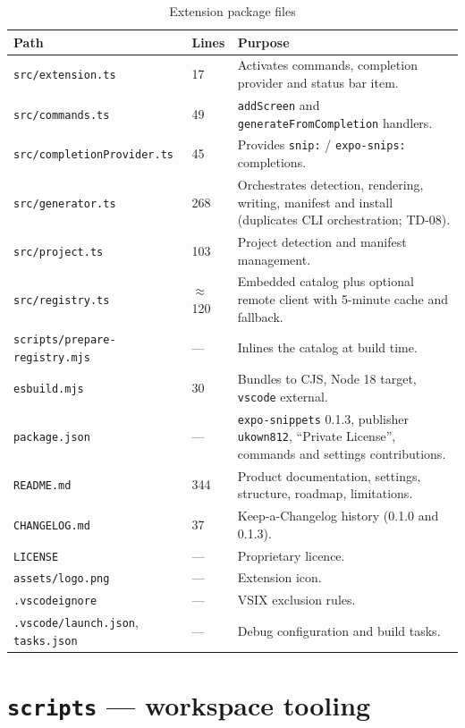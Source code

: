 \begin{longtable}{p{6cm}p{2.2cm}p{6.2cm}}
\caption{Extension package files}\\
\toprule
\textbf{Path} & \textbf{Lines} & \textbf{Purpose} \\
\midrule

\texttt{src/extension.ts} & 17 & Activates commands, completion provider and status
bar item. \\
\texttt{src/commands.ts} & 49 & \texttt{addScreen} and
\texttt{generateFromCompletion} handlers. \\
\texttt{src/completionProvider.ts} & 45 & Provides \texttt{snip:} /
\texttt{expo-snips:} completions. \\
\texttt{src/generator.ts} & 268 & Orchestrates detection, rendering, writing,
manifest and install (duplicates CLI orchestration; TD-08). \\
\texttt{src/project.ts} & 103 & Project detection and manifest management. \\
\texttt{src/registry.ts} & $\approx$120 & Embedded catalog plus optional remote
client with 5-minute cache and fallback. \\
\texttt{scripts/prepare-registry.mjs} & --- & Inlines the catalog at build time. \\
\texttt{esbuild.mjs} & 30 & Bundles to CJS, Node 18 target, \texttt{vscode}
external. \\
\texttt{package.json} & --- & \texttt{expo-snippets} 0.1.3, publisher
\texttt{ukown812}, ``Private License'', commands and settings contributions. \\
\texttt{README.md} & 344 & Product documentation, settings, structure, roadmap,
limitations. \\
\texttt{CHANGELOG.md} & 37 & Keep-a-Changelog history (0.1.0 and 0.1.3). \\
\texttt{LICENSE} & --- & Proprietary licence. \\
\texttt{assets/logo.png} & --- & Extension icon. \\
\texttt{.vscodeignore} & --- & VSIX exclusion rules. \\
\texttt{.vscode/launch.json}, \texttt{tasks.json} & --- & Debug configuration and
build tasks. \\
\bottomrule
\end{longtable}

\section{\texttt{scripts} --- workspace tooling}

